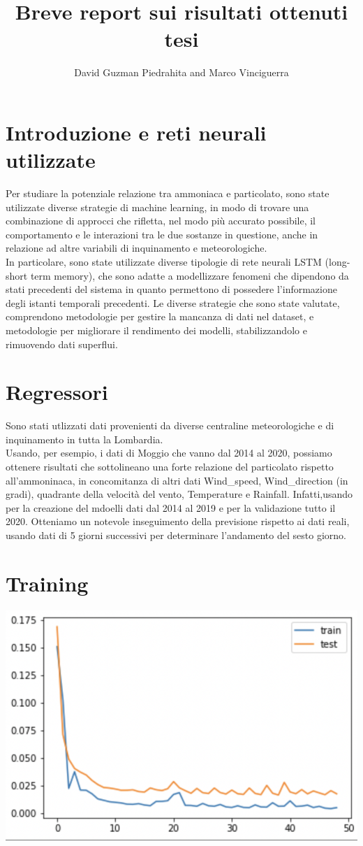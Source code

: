 \documentclass{article}
\title{Breve report sui risultati ottenuti tesi}
\author{David Guzman Piedrahita and Marco Vinciguerra}
\begin{document}
\maketitle        
\section{Introduzione e reti neurali utilizzate}
Per studiare la potenziale relazione tra ammoniaca e particolato, sono state utilizzate
diverse strategie di machine learning, in modo di trovare una combinazione di approcci
che rifletta, nel modo più accurato possibile, il comportamento e le interazioni tra le due 
sostanze in questione, anche in relazione ad altre variabili di inquinamento e meteorologiche.
\\In particolare, sono state utilizzate diverse tipologie di rete neurali LSTM (long-short term memory),
che sono adatte a modellizzare fenomeni che dipendono da stati precedenti del sistema
in quanto permettono di possedere l'informazione degli
istanti temporali precedenti. Le diverse strategie
che sono state valutate, comprendono metodologie per gestire la mancanza di dati nel dataset, e metodologie
per migliorare il rendimento dei modelli, stabilizzandolo e rimuovendo dati superflui.  
\section{Regressori}
Sono stati utlizzati dati provenienti da diverse centraline meteorologiche e di inquinamento in tutta la Lombardia.
\\Usando, per esempio, i dati di Moggio che vanno dal 2014 al 2020, possiamo ottenere risultati che sottolineano una 
forte relazione del particolato rispetto all'ammoninaca, in concomitanza di altri dati  
Wind\_speed, Wind\_direction (in gradi), quadrante della 
velocità del vento, Temperature e Rainfall. 
Infatti,usando per la creazione del mdoelli dati dal 2014 al 2019 e per la 
validazione tutto il 2020. Otteniamo un notevole inseguimento della previsione  rispetto ai dati reali, 
usando dati di 5 giorni successivi per determinare l'andamento del sesto giorno.
\section{Training}
\includegraphics[scale = 0.5]{Immagini/Training.PNG}
\end{document}
